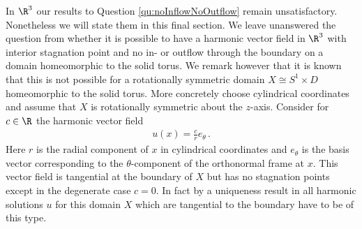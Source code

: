 In $\R^3$ our results to Question \ref{qu:noInflowNoOutflow} remain unsatisfactory.
Nonetheless we will state them in this final section.
We leave unanswered the question from \cite[p.198]{Lortz1970} whether it is possible to have a harmonic vector field in $\R^3$ with
interior stagnation point and no in- or outflow through the boundary on a domain homeomorphic to the solid torus.
We remark however that it is known that this is not possible for a rotationally symmetric domain $X\cong S^1\times D$ homeomorphic to the solid torus.
More concretely choose cylindrical coordinates and assume that $X$ is rotationally symmetric about the $z$-axis.
Consider for $c\in\R$ the harmonic vector field
\begin{align*}
  u(x)=\frac{c}{r}e_\theta\,.
\end{align*}
Here $r$ is the radial component of $x$ in cylindrical coordinates and $e_\theta$ is the basis vector corresponding to the $\theta$-component of the orthonormal frame at $x$.
This vector field is tangential at the boundary of $X$ but has no stagnation points except in the degenerate case $c=0$.
In fact by a uniqueness result in \cite[p.198]{Lortz1970} all harmonic solutions $u$ for this domain $X$ which are tangential to the boundary have to be of this type.

